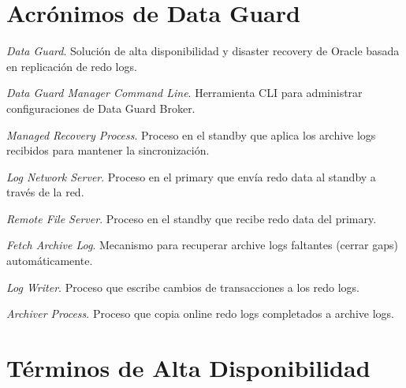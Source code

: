 \documentclass[11pt, a4paper]{report}
\begin{document}
\section{Acrónimos de Data Guard}

\begin{description}[style=nextline, leftmargin=3cm, font=\normalfont\bfseries]
    \item[DG] \textit{Data Guard}. Solución de alta disponibilidad y disaster recovery de Oracle basada en replicación de redo logs.

    \item[DGMGRL] \textit{Data Guard Manager Command Line}. Herramienta CLI para administrar configuraciones de Data Guard Broker.

    \item[MRP / MRP0] \textit{Managed Recovery Process}. Proceso en el standby que aplica los archive logs recibidos para mantener la sincronización.

    \item[LNS] \textit{Log Network Server}. Proceso en el primary que envía redo data al standby a través de la red.

    \item[RFS] \textit{Remote File Server}. Proceso en el standby que recibe redo data del primary.

    \item[FAL] \textit{Fetch Archive Log}. Mecanismo para recuperar archive logs faltantes (cerrar gaps) automáticamente.

    \item[LGWR] \textit{Log Writer}. Proceso que escribe cambios de transacciones a los redo logs.

    \item[ARCn] \textit{Archiver Process}. Proceso que copia online redo logs completados a archive logs.
\end{description}

\section{Términos de Alta Disponibilidad}
\end{document}
